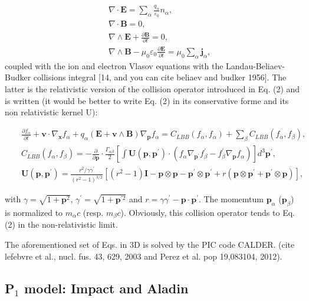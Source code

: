 \begin{eqnarray}
&&\nabla\cdot \mathbf{E}=\sum_\alpha \frac{q_\alpha}{\varepsilon_0} n_{\alpha},\\
&&\nabla\cdot \mathbf{B}=0,\\
&&\nabla\wedge \mathbf{E}+\frac{\partial \mathbf{B}}{\partial t}=0,\\
&&\nabla\wedge \mathbf{B}-\mu_0\varepsilon_0\frac{\partial \mathbf{E}}{\partial t}=\mu_0\sum_\alpha\mathbf{j}_{\alpha},\label{maxw}
\end{eqnarray}
coupled with the ion and electron Vlasov equations with the Landau-Beliaev-Budker collisions integral [14, and you can cite beliaev and budker 1956]. The latter is the relativistic version of the collision operator introduced in Eq. (2) and is written (it would be better to write Eq. (2) in its conservative forme and its non relativistic kernel U):
\begin{widetext}
\begin{eqnarray}
&&\frac{\partial f_\alpha}{\partial t}+\mathbf{v}\cdot\nabla_{\mathbf{x}}f_\alpha+q_\alpha\left(\mathbf{E}+\mathbf{v}\wedge\mathbf{B}\right)\nabla_{\mathbf{p}}f_\alpha=C_{LBB}(f_\alpha,f_\alpha)+\sum_\beta C_{LBB}(f_\alpha,f_\beta),\\
&&C_{LBB}(f_\alpha,f_\beta)=-\frac{\partial}{\partial \mathbf{p}}\cdot\frac{\Gamma_{\alpha\beta}}{2}\left[\int \mathbf{U}(\mathbf{p},\mathbf{p}^\prime)\cdot(f_\alpha\nabla_{\mathbf{p}^\prime}f_\beta^\prime-f_\beta^\prime\nabla_{\mathbf{p}}f_\alpha)\right]d^3\mathbf{p}^\prime,\\
&&\mathbf{U}(\mathbf{p},\mathbf{p}^\prime)=\frac{r^2/\gamma\gamma^\prime}{(r^2-1)^{3/2}}\left[(r^2-1)\mathbf{I}-\mathbf{p}\otimes\mathbf{p}-\mathbf{p}^\prime\otimes\mathbf{p}^\prime+r(\mathbf{p}\otimes\mathbf{p}^\prime+\mathbf{p}^\prime\otimes\mathbf{p})\right],
\end{eqnarray}
\end{widetext}
with $\gamma=\sqrt{1+\mathbf{p}^2}$, $\gamma^\prime=\sqrt{1+\mathbf{p}^{\prime 2}}$ and $r=\gamma\gamma^\prime-\mathbf{p}\cdot\mathbf{p}^\prime$. The momemtum $\mathbf{p}_\alpha$ ($\mathbf{p}_\beta$) is normalized to $m_\alpha c$ (resp. $m_\beta c$). Obviously, this collision operator tends to Eq. (2) in the non-relativistic limit.

The aforementioned set of Eqs. in 3D is solved by the PIC code CALDER. (cite lefebvre et al., nucl. fus. 43, 629, 2003 and Perez et al. pop 19,083104, 2012).

\subsection{P$_1$ model: Impact and Aladin}

